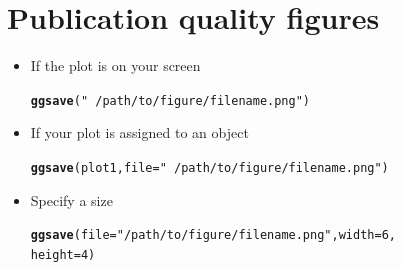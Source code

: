 \documentclass{beamer}\usepackage[]{graphicx}\usepackage[]{color}
\makeatletter
\newcommand{\hlnum}[1]{\textcolor[rgb]{0.686,0.059,0.569}{#1}}%
\newcommand{\hlstr}[1]{\textcolor[rgb]{0.192,0.494,0.8}{#1}}%
\newcommand{\hlstd}[1]{\textcolor[rgb]{0.345,0.345,0.345}{#1}}%
\newcommand{\hlkwc}[1]{\textcolor[rgb]{0.333,0.667,0.333}{#1}}%
\newcommand{\hlkwd}[1]{\textcolor[rgb]{0.737,0.353,0.396}{\textbf{#1}}}%
\newenvironment{kframe}{%
 \def\at@end@of@kframe{}%
 \ifinner\ifhmode%
  \def\at@end@of@kframe{\end{minipage}}%
  \begin{minipage}{\columnwidth}%
 \fi\fi%
 \def\FrameCommand##1{\hskip\@totalleftmargin \hskip-\fboxsep
 \colorbox{shadecolor}{##1}\hskip-\fboxsep
     \hskip-\linewidth \hskip-\@totalleftmargin \hskip\columnwidth}%
 \MakeFramed {\advance\hsize-\width
   \@totalleftmargin\z@ \linewidth\hsize
   \@setminipage}}%
 {\par\unskip\endMakeFramed%
 \at@end@of@kframe}
\newenvironment{knitrout}{}{} %
\makeatother
\begin{document}


\section*{Publication quality figures}
\frame{\sectionpage}



\begin{frame}[fragile]
\begin{itemize}
\item If the plot is on your screen
\begin{knitrout}\footnotesize
{}\color{fgcolor}\begin{kframe}
\begin{alltt}
\hlkwd{ggsave}\hlstd{(}\hlstr{"~/path/to/figure/filename.png"}\hlstd{)}
\end{alltt}
\end{kframe}
\end{knitrout}

\item If your plot is assigned to an object
\begin{knitrout}\footnotesize
{}\color{fgcolor}\begin{kframe}
\begin{alltt}
\hlkwd{ggsave}\hlstd{(plot1,} \hlkwc{file} \hlstd{=} \hlstr{"~/path/to/figure/filename.png"}\hlstd{)}
\end{alltt}
\end{kframe}
\end{knitrout}


\item Specify a size
\begin{knitrout}\footnotesize
{}\color{fgcolor}\begin{kframe}
\begin{alltt}
\hlkwd{ggsave}\hlstd{(}\hlkwc{file} \hlstd{=} \hlstr{"/path/to/figure/filename.png"}\hlstd{,} \hlkwc{width} \hlstd{=} \hlnum{6}\hlstd{,}
\hlkwc{height} \hlstd{=}\hlnum{4}\hlstd{)}
\end{alltt}
\end{kframe}
\end{knitrout}


\end{itemize}
\end{frame}
\end{document}
